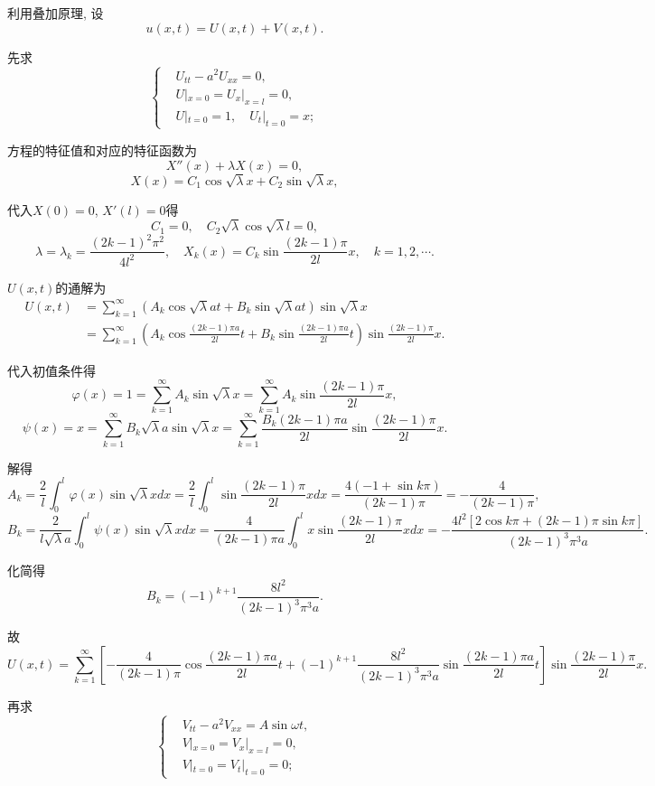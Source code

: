 \documentclass[11pt,a4paper]{article}
\begin{document}
利用叠加原理, 设$$u(x,t)=U(x,t)+V(x,t).$$

先求
$$
  \left\{\begin{aligned}
     & U_{tt}-a^2U_{xx}=0,        \\
     & U|_{x=0}=U_x|_{x=l}=0,                            \\
     & U|_{t=0}=1,\quad U_t|_{t=0}=x;
  \end{aligned}\right.
$$

方程的特征值和对应的特征函数为
$$X''(x)+\lambda X(x)=0,$$
$$X(x)=C_1\cos\sqrt{\lambda}x+C_2\sin\sqrt{\lambda}x,$$

代入$X(0)=0$, $X'(l)=0$得
$$C_1=0,\quad C_2\sqrt{\lambda}\cos\sqrt{\lambda}l=0,$$
$$\lambda=\lambda_k=\frac{(2k-1)^2\pi^2}{4l^2},\quad X_k(x)=C_k\sin\frac{(2k-1)\pi}{2l}x,\quad k=1,2,\cdots.$$

$U(x,t)$的通解为
\begin{align*}
  U(x,t)
   & =\sum_{k=1}^\infty\left(A_k\cos\sqrt{\lambda}at+
  B_k\sin\sqrt{\lambda}at\right)\sin\sqrt{\lambda}x          \\
   & =\sum_{k=1}^\infty\left(A_k\cos\frac{(2k-1)\pi a}{2l}t+
  B_k\sin\frac{(2k-1)\pi a}{2l}t\right)\sin\frac{(2k-1)\pi}{2l}x.
\end{align*}

代入初值条件得
$$\varphi(x)=1=\sum_{k=1}^\infty A_k\sin\sqrt{\lambda}x=\sum_{k=1}^\infty A_k\sin\frac{(2k-1)\pi }{2l}x,$$
$$\psi(x)=x=\sum_{k=1}^\infty B_k\sqrt{\lambda}a\sin\sqrt{\lambda}x=\sum_{k=1}^\infty \frac{B_k(2k-1)\pi a}{2l}\sin\frac{(2k-1)\pi}{2l}x.$$

解得
$$A_k=\frac{2}{l}\int_0^l\varphi(x)\sin\sqrt{\lambda}xdx=\frac{2}{l}\int_0^l\sin\frac{(2k-1)\pi}{2l}xdx=\frac{4(-1+\sin k\pi)}{(2k-1)\pi}=-\frac{4}{(2k-1)\pi},$$
$$B_k=\frac{2}{l\sqrt{\lambda}a}\int_0^l\psi(x)\sin\sqrt{\lambda}xdx=
  \frac{4}{(2k-1)\pi a}\int_0^l x\sin\frac{(2k-1)\pi}{2l}xdx=-\frac{4l^2[2\cos k\pi+(2k-1)\pi\sin k\pi]}{(2k-1)^3\pi^3a}.$$

化简得
$$B_k=(-1)^{k+1}\frac{8l^2}{(2k-1)^3\pi^3a}.$$

故
$$U(x,t)=\sum_{k=1}^\infty\left[-\frac{4}{(2k-1)\pi}\cos\frac{(2k-1)\pi a}{2l}t+
(-1)^{k+1}\frac{8l^2}{(2k-1)^3\pi^3a}\sin\frac{(2k-1)\pi a}{2l}t\right]\sin\frac{(2k-1)\pi}{2l}x.$$

再求
$$
  \left\{\begin{aligned}
     & V_{tt}-a^2V_{xx}=A\sin\omega t, \\
     & V|_{x=0}=V_x|_{x=l}=0,                     \\
     & V|_{t=0}=V_t|_{t=0}=0;
  \end{aligned}\right.
$$
\end{document}
